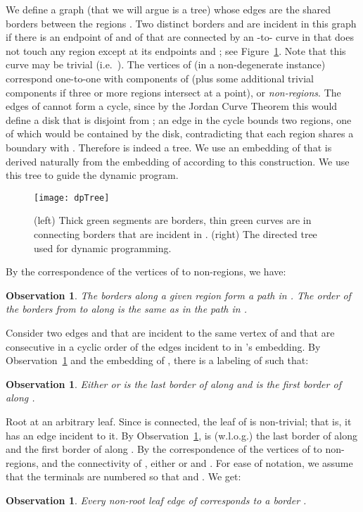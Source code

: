 \documentclass[11pt,twoside]{article}
\newtheorem{observation}[theorem]{Observation}
\begin{document}
We define a graph  (that we will argue is a tree) whose edges are the shared borders  between the regions .
Two distinct borders  and  are incident in this graph if there is an endpoint  of  and  of   that are connected by an -to- curve in  that does not touch any region  except at its endpoints  and ;  see Figure~\ref{fig:T}.  Note that this curve may be trivial (i.e.\ ).  The vertices of  (in a non-degenerate instance) correspond one-to-one with components of  (plus some additional trivial components if three or more regions intersect at a point), or {\em non-regions}. The edges of  cannot form a cycle, since by the Jordan Curve Theorem this would define a disk that is disjoint from ;  an edge  in the cycle bounds two regions, one of which would be contained by the disk, contradicting that each region shares a boundary with .  Therefore  is indeed a tree.   We use an embedding of  that is derived naturally from the embedding of  according to this construction.  We use this tree to guide the dynamic program.


\begin{figure}[ht]
  \centering
        \texttt{[image: dpTree]}
      \caption{(left) Thick green segments are borders, thin green curves are in  connecting borders that are incident in . (right) The directed tree  used for dynamic programming.}
\label{fig:T}
\end{figure}

 
By the correspondence of the vertices of  to non-regions, we have:
\begin{observation}\label{obs:region-path-T}
  The borders  along a given region  form a path in .  The order of the borders from  to  along  is the same as in the path in .
\end{observation}
Consider two edges  and  that are incident to the same vertex  of  and that are consecutive in a cyclic order of the edges incident to  in 's embedding.  By Observation~\ref{obs:region-path-T} and the embedding of , there is a labeling of  such that:
\begin{observation}\label{obs:first-last-border}
  Either  or  is the last border of  along  and  is the first border of  along .
\end{observation}





Root  at an arbitrary leaf.  Since  is connected, the leaf of  is non-trivial; that is, it has an edge  incident to it.  By Observation~\ref{obs:region-path-T},  is (w.l.o.g.) the last border of  along  and the first border of  along .  By the correspondence of the vertices of  to non-regions, and the connectivity of , either  or  and .
For ease of notation, we assume that the terminals are numbered so that  and .  We get:
\begin{observation}\label{obs:leaf-edge}
  Every non-root leaf edge of  corresponds to a border .
\end{observation}
\end{document}
